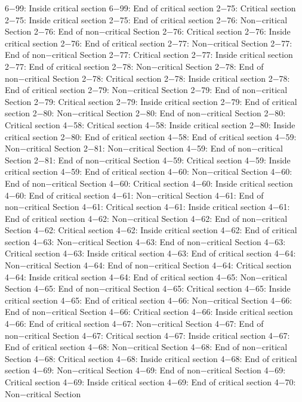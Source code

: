 6−99: Inside critical section
6−99: End of critical section
2−75: Critical section
2−75: Inside critical section
2−75: End of critical section
2−76: Non−critical Section
2−76: End of non−critical Section
2−76: Critical section
2−76: Inside critical section
2−76: End of critical section
2−77: Non−critical Section
2−77: End of non−critical Section
2−77: Critical section
2−77: Inside critical section
2−77: End of critical section
2−78: Non−critical Section
2−78: End of non−critical Section
2−78: Critical section
2−78: Inside critical section
2−78: End of critical section
2−79: Non−critical Section
2−79: End of non−critical Section
2−79: Critical section
2−79: Inside critical section
2−79: End of critical section
2−80: Non−critical Section
2−80: End of non−critical Section
2−80: Critical section
4−58: Critical section
4−58: Inside critical section
2−80: Inside critical section
2−80: End of critical section
4−58: End of critical section
4−59: Non−critical Section
2−81: Non−critical Section
4−59: End of non−critical Section
2−81: End of non−critical Section
4−59: Critical section
4−59: Inside critical section
4−59: End of critical section
4−60: Non−critical Section
4−60: End of non−critical Section
4−60: Critical section
4−60: Inside critical section
4−60: End of critical section
4−61: Non−critical Section
4−61: End of non−critical Section
4−61: Critical section
4−61: Inside critical section
4−61: End of critical section
4−62: Non−critical Section
4−62: End of non−critical Section
4−62: Critical section
4−62: Inside critical section
4−62: End of critical section
4−63: Non−critical Section
4−63: End of non−critical Section
4−63: Critical section
4−63: Inside critical section
4−63: End of critical section
4−64: Non−critical Section
4−64: End of non−critical Section
4−64: Critical section
4−64: Inside critical section
4−64: End of critical section
4−65: Non−critical Section
4−65: End of non−critical Section
4−65: Critical section
4−65: Inside critical section
4−65: End of critical section
4−66: Non−critical Section
4−66: End of non−critical Section
4−66: Critical section
4−66: Inside critical section
4−66: End of critical section
4−67: Non−critical Section
4−67: End of non−critical Section
4−67: Critical section
4−67: Inside critical section
4−67: End of critical section
4−68: Non−critical Section
4−68: End of non−critical Section
4−68: Critical section
4−68: Inside critical section
4−68: End of critical section
4−69: Non−critical Section
4−69: End of non−critical Section
4−69: Critical section
4−69: Inside critical section
4−69: End of critical section
4−70: Non−critical Section
